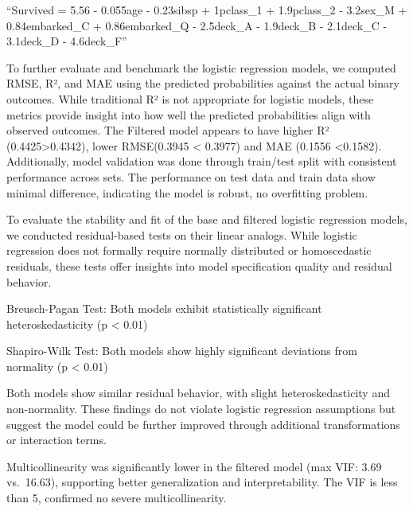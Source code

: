 \documentclass[
  letterpaper,
  DIV=11,
  numbers=noendperiod]{scrartcl}
\begin{document}
``Survived = 5.56 - 0.055age - 0.23sibsp + 1pclass\_1 + 1.9pclass\_2 -
3.2sex\_M + 0.84embarked\_C + 0.86embarked\_Q - 2.5deck\_A - 1.9deck\_B
- 2.1deck\_C - 3.1deck\_D - 4.6deck\_F''

To further evaluate and benchmark the logistic regression models, we
computed RMSE, R², and MAE using the predicted probabilities against the
actual binary outcomes. While traditional R² is not appropriate for
logistic models, these metrics provide insight into how well the
predicted probabilities align with observed outcomes. The Filtered model
appears to have higher R² (0.4425\textgreater0.4342), lower RMSE(0.3945
\textless{} 0.3977) and MAE (0.1556 \textless0.1582). Additionally,
model validation was done through train/test split with consistent
performance across sets. The performance on test data and train data
show minimal difference, indicating the model is robust, no overfitting
problem.

To evaluate the stability and fit of the base and filtered logistic
regression models, we conducted residual-based tests on their linear
analogs. While logistic regression does not formally require normally
distributed or homoscedastic residuals, these tests offer insights into
model specification quality and residual behavior.

Breusch-Pagan Test: Both models exhibit statistically significant
heteroskedasticity (p \textless{} 0.01)

Shapiro-Wilk Test: Both models show highly significant deviations from
normality (p \textless{} 0.01)

Both models show similar residual behavior, with slight
heteroskedasticity and non-normality. These findings do not violate
logistic regression assumptions but suggest the model could be further
improved through additional transformations or interaction terms.

Multicollinearity was significantly lower in the filtered model (max
VIF: 3.69 vs.~16.63), supporting better generalization and
interpretability. The VIF is less than 5, confirmed no severe
multicollinearity.
\end{document}
